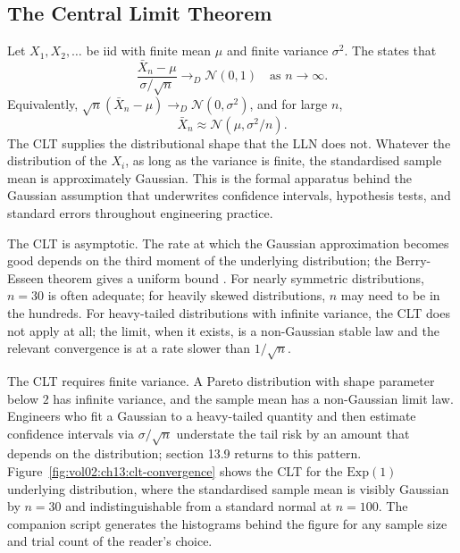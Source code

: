 

\subsection{The Central Limit Theorem}

Let $X_{1}, X_{2}, \ldots$ be iid with finite mean $\mu$ and finite
variance $\sigma^{2}$. The  states
that
\[
\frac{\bar X_{n} - \mu}{\sigma / \sqrt{n}} \to_{D} \mathcal{N}(0, 1)
\quad\text{as } n \to \infty.
\]
Equivalently, $\sqrt{n}(\bar X_{n} - \mu) \to_{D} \mathcal{N}(0,
\sigma^{2})$, and for large $n$,
\[
\bar X_{n} \approx \mathcal{N}(\mu, \sigma^{2}/n).
\]
The CLT supplies the distributional shape that the LLN does not.
Whatever the distribution of the $X_{i}$, as long as the variance
is finite, the standardised sample mean is approximately Gaussian.
This is the formal apparatus behind the Gaussian assumption that
underwrites confidence intervals, hypothesis tests, and standard
errors throughout engineering practice.

The CLT is asymptotic. The rate at which the Gaussian
approximation becomes good depends on the third moment of the
underlying distribution; the Berry-Esseen theorem gives a uniform
bound \cite[ch.~5]{text:wasserman2004}. For nearly symmetric
distributions, $n = 30$ is often adequate; for heavily skewed
distributions, $n$ may need to be in the hundreds. For
heavy-tailed distributions with infinite variance, the CLT does not
apply at all; the limit, when it exists, is a non-Gaussian stable
law and the relevant convergence is at a rate slower than $1/\sqrt{n}$.

The CLT requires finite variance. A Pareto distribution with shape
parameter below $2$ has infinite variance, and the sample mean has a
non-Gaussian limit law. Engineers who fit a Gaussian to a
heavy-tailed quantity and then estimate confidence intervals via
$\sigma/\sqrt{n}$ understate the tail risk by an amount that
depends on the distribution; section 13.9 returns to this pattern.
Figure~\ref{fig:vol02:ch13:clt-convergence} shows the CLT for the
$\mathrm{Exp}(1)$ underlying distribution, where the standardised
sample mean is visibly Gaussian by $n = 30$ and indistinguishable
from a standard normal at $n = 100$. The companion script
generates the histograms behind the figure for any sample size and
trial count of the reader's choice.

